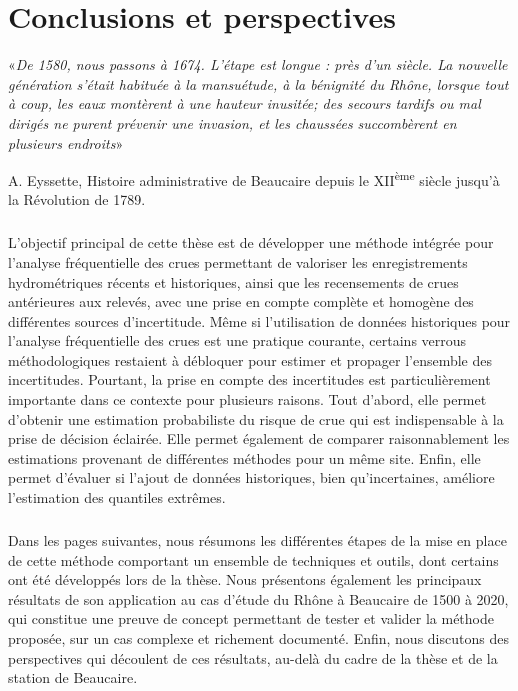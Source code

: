 \chapter{Conclusions et perspectives}
\label{chap:conclu}

	\epigraph{«\textit{De 1580, nous passons à 1674. L'étape est longue : près d'un siècle. La nouvelle génération s'était habituée à la mansuétude, à la bénignité du Rhône, lorsque tout à coup, les eaux montèrent à une hauteur inusitée; des secours tardifs ou mal dirigés ne purent prévenir une invasion, et les chaussées succombèrent en plusieurs endroits}»}{A. Eyssette, Histoire administrative de Beaucaire depuis le XII\textsuperscript{ème} siècle jusqu'à la Révolution de 1789.}

\newpage

\paragraph{} L'objectif principal de cette thèse est de développer une méthode intégrée pour l'analyse fréquentielle des crues permettant de valoriser les enregistrements hydrométriques récents et historiques, ainsi que les recensements de crues antérieures aux relevés, avec une prise en compte complète et homogène des différentes sources d'incertitude. Même si l'utilisation de données historiques pour l'analyse fréquentielle des crues est une pratique courante, certains verrous méthodologiques restaient à débloquer pour estimer et propager l'ensemble des incertitudes. Pourtant, la prise en compte des incertitudes est particulièrement importante dans ce contexte pour plusieurs raisons. Tout d'abord, elle permet d'obtenir une estimation probabiliste du risque de crue qui est indispensable à la prise de décision éclairée. Elle permet également de comparer raisonnablement les estimations provenant de différentes méthodes pour un même site. Enfin, elle permet d'évaluer si l'ajout de données historiques, bien qu'incertaines, améliore l'estimation des quantiles extrêmes.

\paragraph{} Dans les pages suivantes, nous résumons les différentes étapes de la mise en place de cette méthode comportant un ensemble de techniques et outils, dont certains ont été développés lors de la thèse. Nous présentons également les principaux résultats de son application au cas d'étude du Rhône à Beaucaire de 1500 à 2020, qui constitue une preuve de concept permettant de tester et valider la méthode proposée, sur un cas complexe et richement documenté. Enfin, nous discutons des perspectives qui découlent de ces résultats, au-delà du cadre de la thèse et de la station de Beaucaire. 
	
